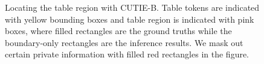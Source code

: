 \documentclass[10pt,twocolumn,letterpaper]{article}
\begin{document}
\begin{figure}
\begin{center}
\end{center}
   \caption{Locating the table region with CUTIE-B. Table tokens are indicated with yellow bounding boxes and table region is indicated with pink boxes, where filled rectangles are the ground truths while the boundary-only rectangles are the inference results. We mask out certain private information with filled red rectangles in the figure.}
\label{fig:table}
\end{figure}
\end{document}
